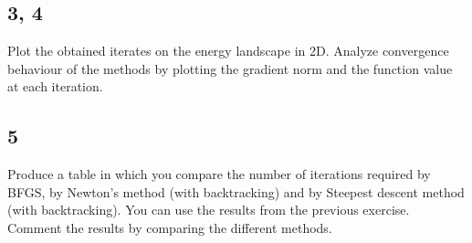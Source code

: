 \documentclass[unicode,11pt,a4paper,oneside,numbers=endperiod,openany]{scrartcl}
\newcommand{\myvec}[1]{\begin{bmatrix} #1 \end{bmatrix}}
\newcommand{\myex}[1]{\begin{equation*}\begin{aligned} #1 \end{aligned}\end{equation*}}
\begin{document}
\subsection*{3, 4}
Plot the obtained iterates on the energy landscape in 2D.
Analyze convergence behaviour of the methods by plotting the gradient norm and the function
value at each iteration.

\subsection*{5}
Produce a table in which you compare the number of iterations required by BFGS, by Newton's
method (with backtracking) and by Steepest descent method (with backtracking). You can use the
results from the previous exercise. Comment the results by comparing the different methods.









\end{document}
